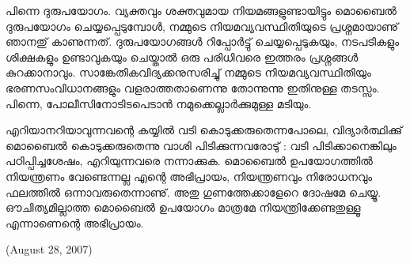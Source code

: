 പിന്നെ ദുരുപയോഗം. വ്യക്തവും ശക്തവുമായ നിയമങ്ങളുണ്ടായിട്ടും മൊബൈല്‍ ദുരുപയോഗം ചെയ്യപ്പെടുമ്പോള്‍,
 നമ്മുടെ നിയമവ്യവസ്ഥിതിയുടെ പ്രശ്നമായാണു് ഞാനതു് കാണുന്നത്. ദുരുപയോഗങ്ങള്‍ റിപ്പോര്‍ട്ടു് ചെയ്യപ്പെടുകയും,
 നടപടികളും ശിക്ഷകളും ഉണ്ടാവുകയും ചെയ്താല്‍ ഒരു പരിധിവരെ ഇത്തരം പ്രശ്നങ്ങള്‍ കുറക്കാനാവും. 
സാങ്കേതികവിദ്യക്കനുസരിച്ചു് നമ്മുടെ നിയമവ്യവസ്ഥിതിയും ഭരണസംവിധാനങ്ങളും വളരാത്തതാണെന്നു തോന്നുന്നു
 ഇതിനുള്ള തടസ്സം. പിന്നെ, പോലീസിനോടിടപെടാന്‍ നമുക്കെല്ലാര്‍ക്കുമുള്ള മടിയും.

എറിയാനറിയാവുന്നവന്റെ കയ്യില്‍ വടി കൊടുക്കരുതെന്നപോലെ, വിദ്യാര്‍ത്ഥിക്കു് മൊബൈല്‍ കൊടുക്കരുതെന്നു വാശി 
പിടിക്കുന്നവരോടു് : വടി പിടിക്കാനെങ്കിലും പഠിപ്പിച്ചശേഷം, എറിയുന്നവരെ നന്നാക്കുക. മൊബൈല്‍ ഉപയോഗത്തില്‍ നിയന്ത്രണം 
വേണ്ടെന്നല്ല എന്റെ അഭിപ്രായം, നിയന്ത്രണവും നിരോധനവും ഫലത്തില്‍ ഒന്നാവരുതെന്നാണു്. അതു ഗുണത്തേക്കാളേറെ 
ദോഷമേ ചെയ്യൂ. ഔചിത്യമില്ലാത്ത മൊബൈല്‍ ഉപയോഗം മാത്രമേ നിയന്ത്രിക്കേണ്ടതുള്ളൂ എന്നാണെന്റെ അഭിപ്രായം.

\begin{flushright}(August 28, 2007)\end{flushright}
\newpage
